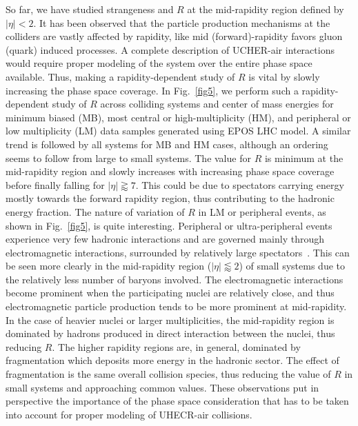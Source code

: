 \documentclass[aps,twocolumn,nofootinbib]{revtex4-1}
\begin{document}
So far, we have studied strangeness and $R$ at the mid-rapidity region defined by $|\eta|<2$. It has been observed that the particle production mechanisms at the colliders are vastly affected by rapidity, like mid (forward)-rapidity favors gluon (quark) induced processes. A complete description of UCHER-air interactions would require proper modeling of the system over the entire phase space available. Thus, making a rapidity-dependent study of $R$ is vital by slowly increasing the phase space coverage. In Fig.~\ref{fig5}, we perform such a rapidity-dependent study of  $R$ across colliding systems and center of mass energies for minimum biased (MB), most central or high-multiplicity (HM), and peripheral or low multiplicity (LM) data samples generated using EPOS LHC model. A similar trend is followed by all systems for MB and HM cases, although an ordering seems to follow from large to small systems. The value for $R$ is minimum at the mid-rapidity region and slowly increases with increasing phase space coverage before finally falling for $|\eta| \gtrapprox 7$. This could be due to spectators carrying energy mostly towards the forward rapidity region, thus contributing to the hadronic energy fraction. The nature of variation of $R$ in LM or peripheral events, as shown in Fig.~\ref{fig5}, is quite interesting. Peripheral or ultra-peripheral events experience very few hadronic interactions and are governed mainly through electromagnetic interactions, surrounded by relatively large spectators~\cite{Bertulani:2005ru,Dyndal:2017wbv}. 
This can be seen more clearly in the mid-rapidity region ($|\eta|\lessapprox 2$) of small systems due to the relatively less number of baryons involved. The electromagnetic interactions become prominent when the participating nuclei are relatively close, and thus electromagnetic particle production tends to be more prominent at mid-rapidity. In the case of heavier nuclei or larger multiplicities, the mid-rapidity region is dominated by hadrons produced in direct interaction between the nuclei, thus reducing $R$. The higher rapidity regions are, in general, dominated by fragmentation which deposits more energy in the hadronic sector. The effect of fragmentation is the same overall collision species, thus reducing the value of $R$ in small systems and approaching common values. 
These observations put in perspective the importance of the phase space consideration that has to be taken into account for proper modeling of UHECR-air collisions.\\
\end{document}
